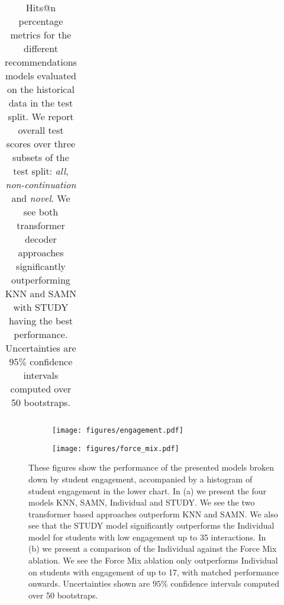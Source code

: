 \documentclass{article}
\begin{document}
\begin{table*}[]
\begin{tabular}{c|c|c|c|c|c}
\end{tabular}
    \caption{Hits@n percentage metrics for the different recommendations models evaluated on the historical data in the test split. We report overall test scores over three subsets of the test split: \textit{all}, \textit{non-continuation} and \textit{novel}. We see both transformer decoder approaches significantly outperforming KNN and SAMN with STUDY having the best performance. Uncertainties are $95\%$ confidence intervals computed over 50 bootstraps.}
\label{tab:main_results}

\end{table*}


\begin{figure}[]
    
    \begin{subfigure}[]{0.4\linewidth}
        \texttt{[image: figures/engagement.pdf]}
        \caption{}
    \end{subfigure}
    \begin{subfigure}[]{0.4\linewidth}    
        \texttt{[image: figures/force\_mix.pdf]}
    \caption{}
    \end{subfigure}
    \caption{These figures show the performance of the presented models broken down by student engagement, accompanied by a histogram of student engagement in the lower chart. In (a) we present the four models KNN, SAMN, Individual and STUDY. We see the two transformer based approaches outperform KNN and SAMN. We also see that the STUDY model significantly outperforms the Individual model for students with low engagement up to 35 interactions. In (b) we present a comparison of the Individual against the Force Mix ablation. We see the Force Mix ablation only outperforms Individual on students with engagement of up to 17, with matched performance onwards. Uncertainties shown are $95\%$ confidence intervals computed over 50 bootstraps.}
    \label{fig:engagement}
\end{figure}
\end{document}
